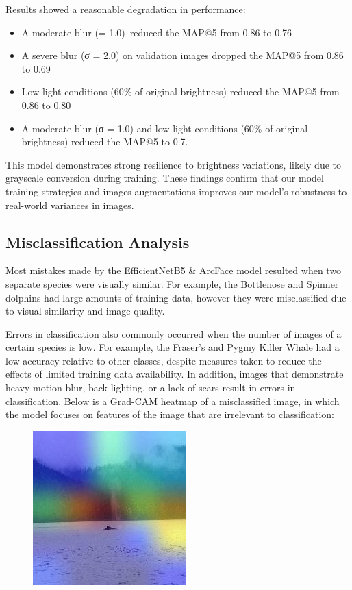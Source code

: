 \documentclass[twocolumn]{article}
\begin{document}
Results showed a reasonable degradation in performance:
 \begin{itemize}
     \item A moderate blur (\σ = 1.0)\ reduced the MAP@5 from 0.86 to 0.76
     \item A severe blur (σ = 2.0) on validation images dropped the MAP@5 from 0.86 to 0.69
     \item Low-light conditions (60\% of original brightness) reduced the MAP@5 from 0.86 to 0.80
     \item A moderate blur (σ = 1.0) and low-light conditions (60\% of original brightness) reduced the MAP@5 to 0.7.
 \end{itemize}

This model demonstrates strong resilience to brightness variations, likely due to grayscale conversion during training. These findings confirm that our model training strategies and images augmentations improves our model's robustness to real-world variances in images.

\subsection{Misclassification Analysis}

Most mistakes made by the EfficientNetB5 \& ArcFace model resulted when two separate species were visually similar. For example, the Bottlenose and Spinner dolphins had large amounts of training data, however they were misclassified due to visual similarity and image quality. 

Errors in classification also commonly occurred when the number of images of a certain species is low. For example, the Fraser's and Pygmy Killer Whale had a low accuracy relative to other classes, despite measures taken to reduce the effects of limited training data availability. In addition, images that demonstrate heavy motion blur, back lighting, or a lack of scars result in errors in classification. Below is a Grad-CAM heatmap of a misclassified image, in which the model focuses on features of the image that are irrelevant to classification:
\begin{figure}
    \centering
    \includegraphics[width=0.5\linewidth]{misclassified.jpg}
\end{figure}
\end{document}
